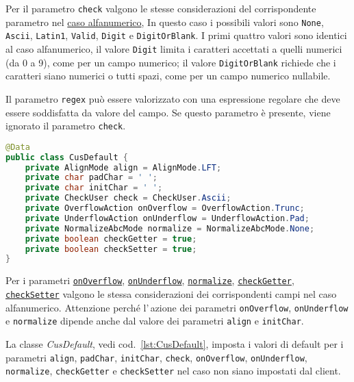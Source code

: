 \documentclass[a4paper,10pt]{report}
\begin{document}
Per il parametro \verb!check! valgono le stesse considerazioni del 
corrispondente parametro nel \hyperlink{abc:chk}{caso alfanumerico},
In questo caso i possibili valori sono \verb!None!, \verb!Ascii!, \verb!Latin1!, 
\verb!Valid!, \verb!Digit! e \verb!DigitOrBlank!.
I primi quattro valori sono identici al caso alfanumerico, il valore 
\verb!Digit! limita i caratteri accettati a quelli numerici (da 0 a 9), come
per un campo numerico; il valore \verb!DigitOrBlank! richiede che i caratteri
siano numerici o tutti spazi, come per un campo numerico nullabile.

Il parametro \verb!regex! può essere valorizzato con una espressione regolare
che deve essere soddisfatta da valore del campo. Se questo parametro è presente,
viene ignorato il parametro \verb!check!.

\begin{figure*}[!htb]
\begin{lstlisting}[language=java, 
caption=class CusDefault (default campo custom), 
label=lst:CusDefault]
@Data
public class CusDefault {
    private AlignMode align = AlignMode.LFT;
    private char padChar = ' ';
    private char initChar = ' ';
    private CheckUser check = CheckUser.Ascii;
    private OverflowAction onOverflow = OverflowAction.Trunc;
    private UnderflowAction onUnderflow = UnderflowAction.Pad;
    private NormalizeAbcMode normalize = NormalizeAbcMode.None;
    private boolean checkGetter = true;
    private boolean checkSetter = true;
}
\end{lstlisting}
\end{figure*}

Per i parametri \hyperlink{abc:ovf}{\texttt{onOverflow}}, 
\hyperlink{abc:unf}{\texttt{onUnderflow}}, 
\hyperlink{abc:nrm}{\texttt{normalize}},
\hyperlink{abc:get}{\texttt{checkGetter}},
\hyperlink{abc:get}{\texttt{checkSetter}} valgono le stessa considerazioni dei 
corrispondenti campi nel caso alfanumerico. Attenzione perché l'\,azione 
dei parametri \verb!onOverflow!, \verb!onUnderflow! e \verb!normalize! dipende 
anche dal valore dei parametri \verb!align! e \verb!initChar!.

La classe \textsl{CusDefault}, vedi cod.~\ref{lst:CusDefault}, imposta i valori
di default per i parametri \verb!align!, \verb!padChar!, \verb!initChar!, 
\verb!check!, \verb!onOverflow!, \verb!onUnderflow!, \verb!normalize!, 
\verb!checkGetter! e \verb!checkSetter! nel caso non siano  impostati dal 
client.
\end{document}

